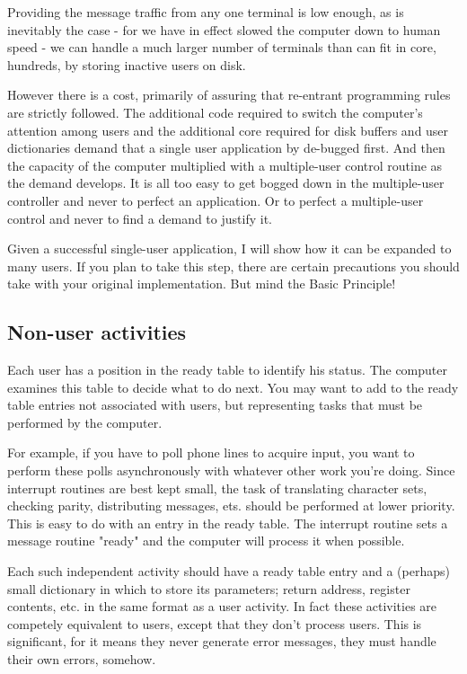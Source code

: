 \documentclass[b5paper, oneside]{book}
\begin{document}
Providing the message traffic from any one terminal is low enough, as is inevitably the case - for we have in effect slowed the computer down to human speed - we can handle a much larger number of terminals than can fit in core, hundreds, by storing inactive users on disk.

However there is a cost, primarily of assuring that re-entrant programming rules are strictly followed. The additional code required to switch the computer's attention among users and the additional core required for disk buffers and user dictionaries demand that a single user application by de-bugged first. And then the capacity of the computer multiplied with a multiple-user control routine as the demand develops. It is all too easy to get bogged down in the multiple-user controller and never to perfect an application. Or to perfect a multiple-user control and never to find a demand to justify it.

Given a successful single-user application, I will show how it can be expanded to many users. If you plan to take this step, there are certain precautions you should take with your original implementation. But mind the Basic Principle!

\subsection{Non-user activities}
Each user has a position in the ready table to identify his status. The computer examines this table to decide what to do next. You may want to add to the ready table entries not associated with users, but representing tasks that must be performed by the computer.

For example, if you have to poll phone lines to acquire input, you want to perform these polls asynchronously with whatever other work you're doing. Since interrupt routines are best kept small, the task of translating character sets, checking parity, distributing messages, ets. should be performed at lower priority. This is easy to do with an entry in the ready table. The interrupt routine sets a message routine "ready" and the computer will process it when possible.

Each such independent activity should have a ready table entry and a (perhaps) small dictionary in which to store its parameters; return address, register contents, etc. in the same format as a user activity. In fact these activities are competely equivalent to users, except that they don't process users. This is significant, for it means they never generate error messages, they must handle their own errors, somehow.
\end{document}
